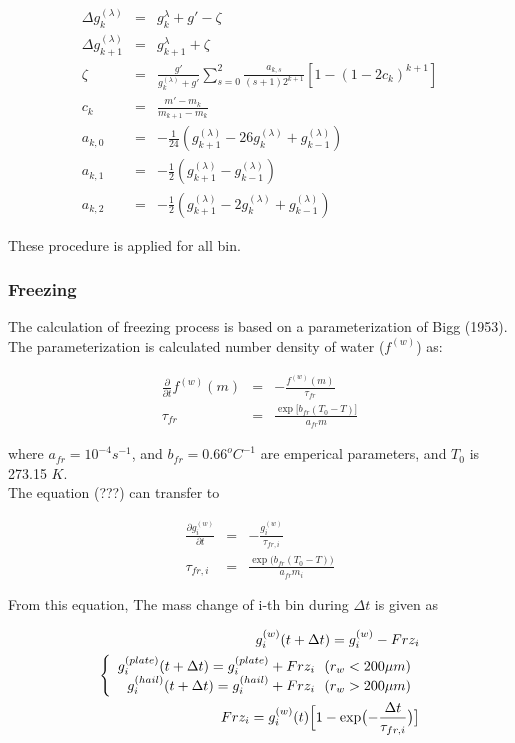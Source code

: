\begin{eqnarray}
\Delta g_{k}^{(\lambda)}&=&g_{k}^{\lambda}+g'-\zeta\\
\Delta g_{k+1}^{(\lambda)}&=&g_{k+1}^{\lambda}+\zeta\\
\zeta&=&\frac{g'}{g_{k}^{(\lambda)}+g'}\sum_{s=0}^{2}\frac{a_{k,s}}{(s+1)2^{k+1}}[1-(1-2c_{k})^{k+1}]\nonumber\\
c_{k}&=&\frac{m'-m_{k}}{m_{k+1}-m_{k}}\nonumber\\
a_{k,0}&=&-\frac{1}{24}(g_{k+1}^{(\lambda)}-26g_{k}^{(\lambda)}+g_{k-1}^{(\lambda)})\nonumber\\
a_{k,1}&=&-\frac{1}{2}(g_{k+1}^{(\lambda)}-g_{k-1}^{(\lambda)})\nonumber\\
a_{k,2}&=&-\frac{1}{2}(g_{k+1}^{(\lambda)}-2g_{k}^{(\lambda)}+g_{k-1}^{(\lambda)})\nonumber
\end{eqnarray}

These procedure is applied for all bin.

\subsubsection{Freezing}
The calculation of freezing process is based on a parameterization of Bigg (1953). The parameterization is calculated number density of water ($f^{(w)}$) as:

\begin{eqnarray}
\frac{\partial}{\partial t}f^{(w)}(m)&=&-\frac{f^{(w)}(m)}{\tau_{fr}}\\
\tau_{fr}&=&\frac{\exp \bigl[b_{fr}(T_{0}-T)\bigr]}{a_{fr} m}\nonumber 
\end{eqnarray}

where $a_{fr}=10^{-4}s^{-1}$, and $b_{fr}=0.66^{o}C^{-1}$ are emperical parameters, and $T_{0}$ is 273.15 $K$.\\
The equation (???) can transfer to

\begin{eqnarray}
\frac{\partial g_{i}^{(w)}}{\partial t}&=&-\frac{g_{i}^{(w)}}{\tau_{fr,i}}\\
\tau_{fr,i}&=&\frac{\exp\bigl (b_{fr}(T_{0}-T)\bigr )}{a_{fr}m_{i}}\nonumber
\end{eqnarray} 

From this equation, The mass change of i-th bin during $\Delta t$ is given as

\begin{eqnarray}
g_{i}^{(w)}(t+\Delta t)=g_{i}^{(w)}-Frz_{i}\\
\left \{
\begin{array}{r}
g_{i}^{(plate)}(t+\Delta t)=g_{i}^{(plate)}+Frz_{i}\:\:\: (r_{w}<200\mu m)\\
g_{i}^{(hail)}(t+\Delta t)=g_{i}^{(hail)}+Frz_{i}\:\:\: (r_{w}>200\mu m)
\end{array} \right.\\
Frz_{i}=g_{i}^{(w)}(t)\Bigl [1-\exp\bigl (-\frac{\Delta t}{\tau_{fr,i}}\bigr )\bigr]\nonumber
\end{eqnarray}


